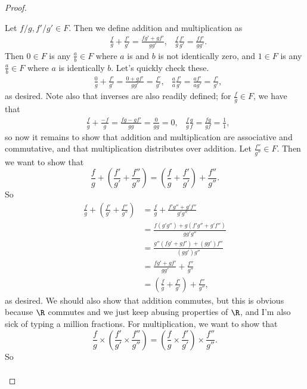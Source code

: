 \documentclass{assignment}
\begin{document}
\begin{proof}
  \begin{qparts}
    \item
  Let $f/g, f'/g'\in F$. Then we define addition and multiplication as 
  \begin{align*}
    &\frac{f}{g} + \frac{f'}{g'} = \frac{fg' + gf'}{gg'},
    &\frac{f}{g}\frac{f'}{g'} = \frac{ff'}{gg'}.
  \end{align*}
  Then $0\in F$ is any $\frac{a}{b}\in F$ where $a$ is and $b$ is not identically zero, and $1\in F$
  is any $\frac{a}{b}\in F$ where $a$ is identically $b$. Let's quickly check these.
  \begin{align*}
    &\frac{0}{g} + \frac{f'}{g'} = \frac{0 + gf'}{gg'} = \frac{f'}{g'},
    &\frac{a}{a}\frac{f'}{g'} = \frac{af'}{ag'} = \frac{f'}{g'},
  \end{align*}
  as desired. Note also that inverses are also readily defined; for $\frac{f}{g}\in F$, we have that
  \begin{align*}
    &\frac{f}{g} + \frac{-f}{g} = \frac{fg - gf'}{gg} = \frac{0}{gg} = 0,
    &\frac{f}{g}\frac{g}{f} = \frac{fg}{gf} = \frac{1}{1},
  \end{align*}
  so now it remains to show that addition and multiplication are associative and commutative, and 
  that multiplication distributes over addition. Let $\frac{f''}{g''}\in F$. Then we want to show that
  $$\frac{f}{g} + \left(\frac{f'}{g'} + \frac{f''}{g''}\right) = \left(\frac{f}{g} + \frac{f'}{g'}\right)
  + \frac{f''}{g''}.$$ So
  \begin{align*}
    \frac{f}{g} + \left(\frac{f'}{g'} + \frac{f''}{g''}\right) &= \frac{f}{g} + \frac{f'g'' + g'f''}{
  g'g''} \\
  &= \frac{f(g'g'') + g(f'g'' + g'f'')}{gg'g''} \\
  &= \frac{g''(fg' + gf') + (gg')f''}{(gg')g''} \\
  &= \frac{fg' + gf'}{gg'} + \frac{f''}{g''} \\
  &= \left(\frac{f}{g} + \frac{f'}{g'}\right) + \frac{f''}{g''},
  \end{align*}
  as desired. We should also show that addition commutes, but this is obvious because $\R$ commutes and
  we just keep abusing properties of $\R$, and I'm also sick of typing a million fractions. For 
  multiplication, we want to show that $$\frac{f}{g} \times \left(\frac{f'}{g'} \times
  \frac{f''}{g''}\right) = \left(\frac{f}{g} \times \frac{f'}{g'}\right) \times \frac{f''}{g''}.$$ So
  \begin{align*}

\end{align*}
\end{qparts}
\end{proof}
\end{document}
